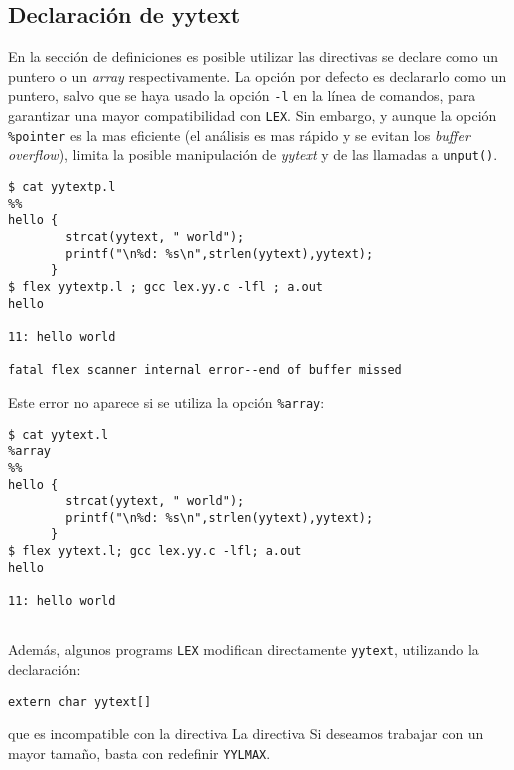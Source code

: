 \subsection{Declaraci\'on de yytext}
\label{section:yytextdec}
En la sección de definiciones es posible utilizar las directivas
\verb@%pointer@ o \verb@%array@. Estas directivas hacen que \tei{yytext}
se declare como un puntero o un \emph{array} respectivamente.
La opción por defecto es declararlo como un puntero, salvo que se haya
usado la opción \verb|-l| en la línea de comandos, para garantizar una
mayor compatibilidad con \verb|LEX|.
Sin embargo, y aunque la opci\'on  \verb|%pointer| es la mas eficiente
(el análisis es mas rápido y se evitan los \emph{buffer overflow}),
limita la posible manipulaci\'on de \emph{yytext} y de las llamadas
a \verb|unput()|.
\begin{verbatim}
$ cat yytextp.l
%%
hello {
        strcat(yytext, " world");
        printf("\n%d: %s\n",strlen(yytext),yytext);
      }
$ flex yytextp.l ; gcc lex.yy.c -lfl ; a.out
hello
 
11: hello world
 
fatal flex scanner internal error--end of buffer missed 
\end{verbatim}
Este error no aparece si se utiliza la opci\'on \verb|%array|:
\begin{verbatim}
$ cat yytext.l
%array
%%
hello {
        strcat(yytext, " world");
        printf("\n%d: %s\n",strlen(yytext),yytext);
      }
$ flex yytext.l; gcc lex.yy.c -lfl; a.out
hello
 
11: hello world
                              
\end{verbatim}

Además, algunos programs \verb|LEX|  modifican directamente \verb|yytext|, utilizando la declaración:

\noindent \verb|extern char yytext[]|

\noindent que es incompatible con la directiva \verb@%pointer@ (pero correcta con \verb@%array@).
La directiva \verb@%array@ define \verb|yytext| como un \emph{array} de tamaño \verb|YYLMAX|.
Si deseamos trabajar con un mayor tamaño, basta con redefinir \verb|YYLMAX|.


